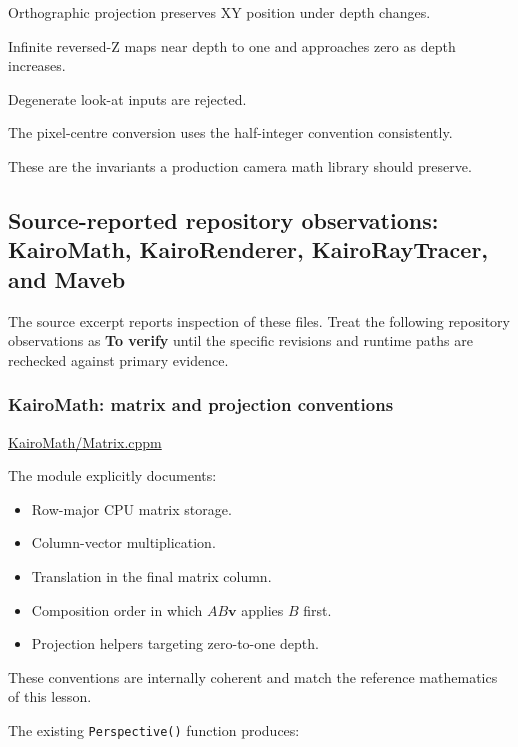 Orthographic projection preserves XY position under depth changes.

Infinite reversed-Z maps near depth to one and approaches zero as depth increases.

Degenerate look-at inputs are rejected.

The pixel-centre conversion uses the half-integer convention consistently.

These are the invariants a production camera math library should preserve.

\subsection{Source-reported repository observations: KairoMath, KairoRenderer, KairoRayTracer, and Maveb}\label{02-foundations-ii-ch037-source-reported-repository-observations-kairomath-kairorenderer-kairoraytracer-and-maveb}

The source excerpt reports inspection of these files. Treat the following repository observations as \textbf{To verify} until the specific revisions and runtime paths are rechecked against primary evidence.

\subsubsection{KairoMath: matrix and projection conventions}\label{02-foundations-ii-ch037-kairomath-matrix-and-projection-conventions}

\href{https://github.com/swayam8624/KairoMath/blob/master/Matrix.cppm?utm_source=chatgpt.com}{KairoMath/Matrix.cppm}

The module explicitly documents:

\begin{itemize}
\tightlist
\item
  Row-major CPU matrix storage.
\item
  Column-vector multiplication.
\item
  Translation in the final matrix column.
\item
  Composition order in which \(AB\mathbf v\) applies \(B\) first.
\item
  Projection helpers targeting zero-to-one depth.
\end{itemize}

These conventions are internally coherent and match the reference mathematics of this lesson.

The existing \texttt{Perspective()} function produces:

